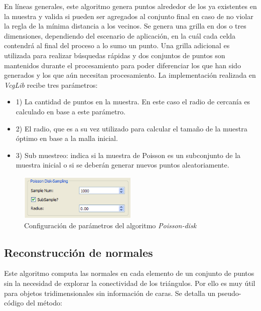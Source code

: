 En líneas generales, este algoritmo genera puntos alrededor de los ya existentes en la muestra y valida si pueden ser agregados al conjunto final en caso de no violar la regla de la mínima distancia a los vecinos. Se genera una grilla en dos o tres dimensiones, dependiendo del escenario de aplicación, en la cuál cada celda contendrá al final del proceso a lo sumo un punto. Una grilla adicional es utilizada para realizar búsquedas rápidas y dos conjuntos de puntos son mantenidos durante el procesamiento para poder diferenciar los que han sido generados y los que aún necesitan procesamiento.
La implementación realizada en \emph{VcgLib} recibe tres parámetros:
\begin{itemize}
	\item 1) La cantidad de puntos en la muestra. En este caso el radio de cercanía es calculado en base a este parámetro.
	\item 2) El radio, que es a su vez utilizado para calcular el tamaño de la muestra óptimo en base a la malla inicial.
	\item 3) Sub muestreo: indica si la muestra de Poisson es un subconjunto de la muestra inicial o si se deberán generar nuevos puntos aleatoriamente.
\end{itemize}

\begin{figure}[H]
  \centering
    \includegraphics[width=0.5\textwidth]{./Cap6_reconstruccion/malla-poissongui.png}
  \caption{Configuración de parámetros del algoritmo \emph{Poisson-disk}}
  \label{fig:Mesh-PoissonGui}
\end{figure}

\subsection{Reconstrucción de normales}

Este algoritmo computa las normales en cada elemento de un conjunto de puntos sin la necesidad de explorar la conectividad de los triángulos. Por ello es muy útil para objetos tridimensionales sin información de caras.
Se detalla un pseudo-código del método:


